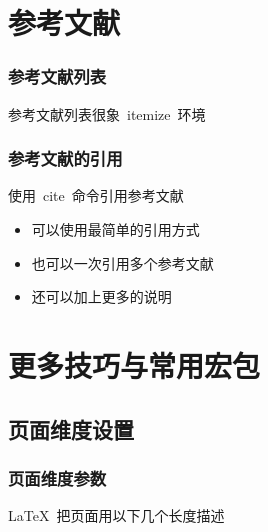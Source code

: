 \section{参考文献}


\begin{frame}
	\frametitle{参考文献列表}
	\begin{block}{参考文献列表很象~itemize~环境}
		
	\end{block}
\end{frame}

\begin{frame}
	\frametitle{参考文献的引用}
	\begin{block}{使用~\alert{cite}~命令引用参考文献}
		\begin{itemize}
			\item 可以使用最简单的引用方式
				
			\item 也可以一次引用多个参考文献
				
			\item 还可以加上更多的说明
				
		\end{itemize}
	\end{block}
\end{frame}

%
%
%

\section{更多技巧与常用宏包}

\subsection{页面维度设置}
\begin{frame}
	\frametitle{页面维度参数}
	\begin{block}{\LaTeX~把页面用以下几个长度描述}
	\end{block}

\end{frame}

